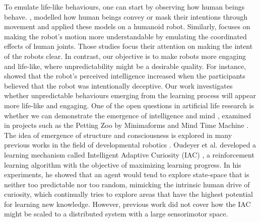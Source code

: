 To emulate life-like behaviours, one can start by observing how human beings behave. \cite{Dragan2015}, \cite{AncaDraga2014} modelled how human beings convey or mask their intentions through movement and applied these models on a humanoid robot. Similarly, \cite{Gielniak2013} focuses on making the robot's motion more understandable by emulating the coordinated effects of human joints. Those studies focus their attention on making the intent of the robots clear. In contrast, our objective is to make robots more engaging and life-like, where unpredictability might be a desirable quality. For instance, \cite{AncaDraga2014} showed that the robot's perceived intelligence increased when the participants believed that the robot was intentionally deceptive. Our work investigates whether unpredictable behaviours emerging from the learning process will appear more life-like and engaging.
One of the open questions in artificial life research is whether we can demonstrate the emergence of intelligence and mind \cite{Bedau2000}, examined in projects such as the Petting Zoo by Minimaforms \cite{Minimaforms} and Mind Time Machine \cite{Ikegami2013}. The idea of emergence of structure and consciousness is explored in many previous works in the field of developmental robotics \cite{Lungarella2003}\cite{Asada2009}\cite{Kompella2014}. Oudeyer et al. developed a learning mechanism called Intelligent Adaptive Curiosity (IAC) \cite{Oudeyer2007}, a reinforcement learning algorithm with the objective of maximizing learning progress. In his experiments, he showed that an agent would tend to explore state-space that is neither too predictable nor too random, mimicking the intrinsic human drive of curiosity, which continually tries to explore areas that have the highest potential for learning new knowledge. However, previous work did not cover how the IAC might be scaled to a distributed system with a large sensorimotor space. 


